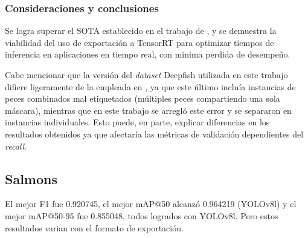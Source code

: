 \subsubsection{Consideraciones y conclusiones}
Se logra superar el SOTA establecido en el trabajo de \cite[Alejandro Guerrero, 2024]{Guerrero2024}, y se demuestra la viabilidad del uso de exportación a TensorRT para optimizar tiempos de inferencia en aplicaciones en tiempo real, con minima perdida de desempeño.

Cabe mencionar que la versión del \textit{dataset} Deepfish utilizada en este trabajo difiere ligeramente de la empleada en \cite{Guerrero2024}, ya que este último incluía instancias de peces combinados mal etiquetados (múltiples peces compartiendo una sola máscara), mientras que en este trabajo se arregló este error y se separaron en instancias individuales. Esto puede, en parte, explicar diferencias en los resultados obtenidos ya que afectaría las métricas de validación dependientes del \textit{recall}.


\subsection{Salmons}
El mejor F1 fue 0.920745, el mejor mAP@50 alcanzó 0.964219 (YOLOv8l) y el mejor mAP@50-95 fue 0.855048, todos logrados con YOLOv8l. Pero estos resultados varian con el formato de exportación.


